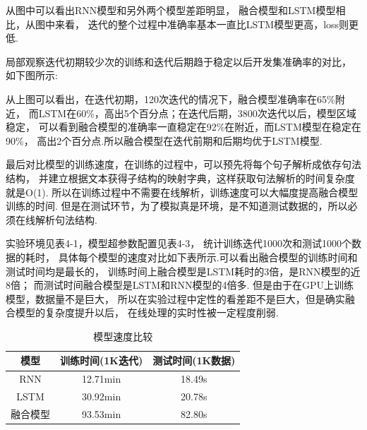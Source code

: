 \documentclass[bachelor,adobefonts]{jnuthesis}
\begin{document}
从图中可以看出RNN模型和另外两个模型差距明显，
融合模型和LSTM模型相比，从图中来看，
迭代的整个过程中准确率基本一直比LSTM模型更高，loss则更低.

局部观察迭代初期较少次的训练和迭代后期趋于稳定以后开发集准确率的对比，
如下图所示:


从上图可以看出，在迭代初期，120次迭代的情况下，融合模型准确率在65\%附近，
而LSTM在60\%，高出5个百分点；在迭代后期，3800次迭代以后，模型区域稳定，
可以看到融合模型的准确率一直稳定在92\%在附近，而LSTM模型在稳定在90\%，
高出2个百分点.所以融合模型在迭代前期和后期均优于LSTM模型.

最后对比模型的训练速度，在训练的过程中，可以预先将每个句子解析成依存句法结构，
并建立根据文本获得子结构的映射字典，这样获取句法解析的时间复杂度就是O(1).
所以在训练过程中不需要在线解析，训练速度可以大幅度提高融合模型训练的时间.
但是在测试环节，为了模拟真是环境，是不知道测试数据的，所以必须在线解析句法结构.

实验环境见表4-1，模型超参数配置见表4-3，
统计训练迭代1000次和测试1000个数据的耗时，
具体每个模型的速度对比如下表所示.可以看出融合模型的训练时间和测试时间均是最长的，
训练时间上融合模型是LSTM耗时的3倍，是RNN模型的近8倍；
而测试时间融合模型是LSTM和RNN模型的4倍多.
但是由于在GPU上训练模型，数据量不是巨大，
所以在实验过程中定性的看差距不是巨大，但是确实融合模型的复杂度提升以后，
在线处理的实时性被一定程度削弱.

\begin{table}[h!]
  \centering
  \begin{tabular}{ccc}
    \toprule
    \textbf{模型} & \textbf{训练时间(1K迭代)} & \textbf{测试时间(1K数据)}\\
    \midrule
    RNN &  12.71min & 18.49s \\ 
    LSTM & 30.92min & 20.78s \\ 
    融合模型 & 93.53min & 82.80s \\ 
    \bottomrule
  \end{tabular}
  \caption{模型速度比较}
\end{table}
\end{document}
